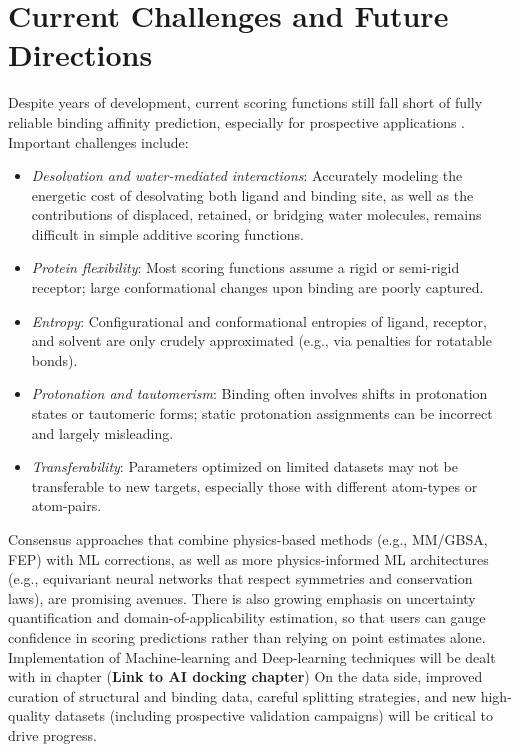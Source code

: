 \documentclass[12pt]{article}
\begin{document}
\section{Current Challenges and Future Directions}

Despite years of development, current scoring functions still fall short of fully reliable binding affinity prediction, especially for prospective applications\cite{CH3_Wang2017,CH3_Su2019_CASF2016} . Important challenges include:
\begin{itemize}
    \item \textit{Desolvation and water-mediated interactions}: Accurately modeling the energetic cost of desolvating both ligand and binding site, as well as the contributions of displaced, retained, or bridging water molecules, remains difficult in simple additive scoring functions.
    \item \textit{Protein flexibility}: Most scoring functions assume a rigid or semi-rigid receptor; large conformational changes upon binding are poorly captured.
    \item \textit{Entropy}: Configurational and conformational entropies of ligand, receptor, and solvent are only crudely approximated (e.g., via penalties for rotatable bonds).
    \item \textit{Protonation and tautomerism}: Binding often involves shifts in protonation states or tautomeric forms; static protonation assignments can be incorrect and largely misleading.
    \item \textit{Transferability}: Parameters optimized on limited datasets may not be transferable to new targets, especially those with different atom-types or atom-pairs.
\end{itemize}

Consensus approaches that combine physics-based methods (e.g., MM/GBSA, FEP) with ML corrections, as well as more physics-informed ML architectures (e.g., equivariant neural networks that respect symmetries and conservation laws), are promising avenues. There is also growing emphasis on uncertainty quantification and domain-of-applicability estimation, so that users can gauge confidence in scoring predictions rather than relying on point estimates alone. Implementation of Machine-learning and Deep-learning techniques will be dealt with in chapter (\textbf{Link to AI docking chapter})
On the data side, improved curation of structural and binding data, careful splitting strategies, and new high-quality datasets (including prospective validation campaigns) will be critical to drive progress.\cite{CH3_Liu2015_PDBbind}
\end{document}
